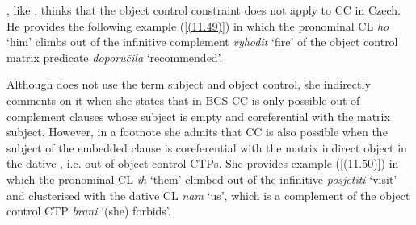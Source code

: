 
\noindent \citet[129]{Hana07}, like \citet{Rezac99, Rezac05}, thinks that the object control constraint does not apply to CC in Czech. He provides the following example (\ref{(11.49)}) in which the pronominal CL \textit{ho} ‘him’ climbs out of the infinitive complement \textit{vyhodit} ‘fire’ of the object control matrix predicate \textit{doporučila} ‘recommended’.


\noindent Although \citet[4]{Aljovic05} does not use the term subject and object control, she indirectly comments on it when she states that in BCS CC is only possible out of complement clauses whose subject is empty and coreferential with the matrix subject. However, in a footnote she admits that CC is also possible when the subject of the embedded clause is coreferential with the matrix indirect object in the dative \citep[cf.][4]{ Aljovic05}, i.e. out of object control CTPs. She provides example (\ref{(11.50)}) in which the pronominal CL \textit{ih} ‘them’ climbed out of the infinitive \textit{posjetiti} ‘visit’ and clusterised with the dative CL \textit{nam} ‘us’, which is a complement of the object control CTP \textit{brani} ‘(she) forbids’. 


